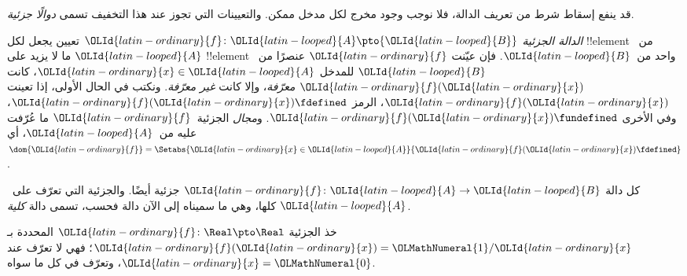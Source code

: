 \documentclass[../../../include/open-logic-section]{subfiles}
\begin{document}


\begin{explain}
قد ينفع إسقاط شرط من تعريف الدالة، فلا نوجب وجود مخرج لكل مدخل
ممكن. والتعيينات التي تجوز عند هذا التخفيف تسمى \emph{دوالًا جزئية}.
\end{explain}

\begin{defn}
\emph{الدالة الجزئية} ${\OLId{latin-ordinary}{f}} \colon {\OLId{latin-looped}{A}} \pto {\OLId{latin-looped}{B}}$ تعيين يجعل لكل
!!{element} من~${\OLId{latin-looped}{A}}$ ما لا يزيد على !!{element} واحد من~${\OLId{latin-looped}{B}}$.
فإن عيّنت ${\OLId{latin-ordinary}{f}}$ عنصرًا من~${\OLId{latin-looped}{B}}$ للمدخل ${\OLId{latin-ordinary}{x}} \in {\OLId{latin-looped}{A}}$، كانت ${\OLId{latin-ordinary}{f}}({\OLId{latin-ordinary}{x}})$
\emph{معرّفة}، وإلا كانت \emph{غير معرّفة}. ونكتب في الحال الأولى،
إذا تعينت ${\OLId{latin-ordinary}{f}}({\OLId{latin-ordinary}{x}})$، الرمز ${\OLId{latin-ordinary}{f}}({\OLId{latin-ordinary}{x}}) \fdefined$، وفي الأخرى ${\OLId{latin-ordinary}{f}}({\OLId{latin-ordinary}{x}}) \fundefined$.
و\emph{مجال} الجزئية~${\OLId{latin-ordinary}{f}}$ ما عُرّفت عليه من~${\OLId{latin-looped}{A}}$، أي
$\dom{{\OLId{latin-ordinary}{f}}} = \Setabs{{\OLId{latin-ordinary}{x}} \in {\OLId{latin-looped}{A}}}{{\OLId{latin-ordinary}{f}}({\OLId{latin-ordinary}{x}}) \fdefined}$.
\end{defn}

\begin{ex}
كل دالة ${\OLId{latin-ordinary}{f}}\colon {\OLId{latin-looped}{A}} \to {\OLId{latin-looped}{B}}$ جزئية أيضًا. والجزئية التي تعرّف على~${\OLId{latin-looped}{A}}$
كلها، وهي ما سميناه إلى الآن دالة فحسب، تسمى دالة \emph{كلية}.
\end{ex}

\begin{ex}
خذ الجزئية ${\OLId{latin-ordinary}{f}} \colon \Real \pto \Real$ المحددة بـ${\OLId{latin-ordinary}{f}}({\OLId{latin-ordinary}{x}}) = {\OLMathNumeral{1}}/{\OLId{latin-ordinary}{x}}$؛
فهي لا تعرّف عند ${\OLId{latin-ordinary}{x}} = {\OLMathNumeral{0}}$، وتعرّف في كل ما سواه.
\end{ex}
\end{document}
